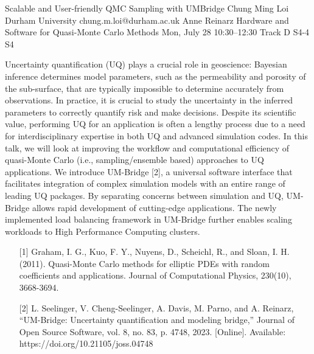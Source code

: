 \begin{talk}
  {Scalable and User-friendly QMC Sampling with UMBridge}%
  {Chung Ming Loi}%
  {Durham University}%
  {chung.m.loi@durham.ac.uk}%
  {Anne Reinarz}%
  {Hardware and Software for Quasi-Monte Carlo Methods}%
  {Mon, July 28 10:30–12:30 Track D}%
  {S4-4}%
  {S4}%
				
			
Uncertainty quantification (UQ) plays a crucial role in geoscience: Bayesian inference determines model parameters, such as the permeability and porosity of the sub-surface, that are typically impossible to determine accurately from observations. In practice, it is crucial to study the uncertainty in the inferred parameters to correctly quantify risk and make decisions. Despite its scientific value, performing UQ for an application is often a lengthy process due to a need for interdisciplinary expertise in both UQ and advanced simulation codes. In this talk, we will look at improving the workflow and computational efficiency of quasi-Monte Carlo (i.e., sampling/ensemble based) approaches to UQ applications. We introduce UM-Bridge [2], a universal software interface that facilitates integration of complex simulation models with an entire range of leading UQ packages. By separating concerns between simulation and UQ, UM-Bridge allows rapid development of cutting-edge applications. The newly implemented load balancing framework in UM-Bridge further enables scaling workloads to High Performance Computing clusters.

\begin{enumerate}
    \item[{[1]}] Graham, I. G., Kuo, F. Y., Nuyens, D., Scheichl, R., and Sloan, I. H. (2011). Quasi-Monte Carlo methods for elliptic PDEs with random coefficients and applications. Journal of Computational Physics, 230(10), 3668-3694.
    \item[{[2]}]  L. Seelinger, V. Cheng-Seelinger, A. Davis, M. Parno, and A. Reinarz, “UM-Bridge: Uncertainty quantification and modeling bridge,” Journal of Open Source Software, vol. 8, no. 83, p. 4748, 2023. [Online]. Available: https://doi.org/10.21105/joss.04748
\end{enumerate}

\end{talk}

